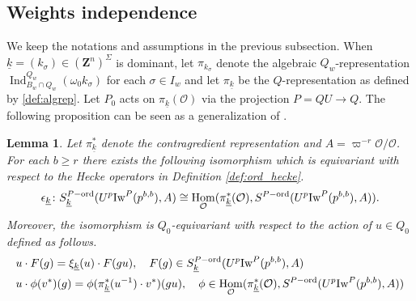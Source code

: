 \documentclass[leqno]{amsart}
\newtheorem{lem}[thm]{Lemma}
\theoremstyle{definition}
\theoremstyle{remark}
\newcommand{\oo}{\mathcal{O}}
\newcommand{\Z}{{\mathbf{Z}}}
\DeclareMathOperator{\Hom}{Hom}
\DeclareMathOperator{\Ind}{Ind}
\newcommand{\wt}[1]{\underline{ #1 }}
\newcommand{\Iw}{\textnormal{Iw}} %
\newcommand{\ord}{\textnormal{ord}} %
\begin{document}
\subsection{Weights independence}

We keep the notations and assumptions in the 
previous subsection.
When $\wt{k}=(k_\sigma)\in (\Z^n)^{\Sigma}$ is dominant,
let $\pi_{k_{\sigma}}$ denote 
the algebraic $Q_w$-representation
$\Ind_{B_w\cap Q_w}^{Q_w}(\omega_0 k_\sigma)$
for each $\sigma\in I_w$ 
and let $\pi_{\wt{k}}$ be the $Q$-representation
as defined by \eqref{def:algrep}.
Let $P_0$ acts on $\pi_{\wt{k}}(\oo)$
via the projection $P=QU\to Q$.
The following proposition can be seen as
a generalization of \cite[Prop 2.22]{ger}.

\begin{lem}
	Let $\pi_{\wt{k}}^*$ denote the contragredient
	representation and $A=\varpi^{-r}\oo/\oo$.
	For each $b\geq r$ there exists 
    the following isomorphism 
    which is equivariant with respect to the Hecke operators
    in Definition \ref{def:ord_hecke}.
	\[
		\epsilon_{\wt{k}} \colon 
		S_{\wt{k}}^{P-\ord}(U^p\Iw^P(p^{b,b}),A)\cong 
		\Hom_{\oo}(\pi_{\wt{k}}^*(\oo),
		S^{P-\ord}(U^p\Iw^P(p^{b,b}),A)).
	\]
	Moreover, the isomorphism is $Q_0$-equivariant 
    with respect to
	the action of $u\in Q_0$ defined as follows.
	\begin{align*}
	&u\cdot F(g)=\xi_{\wt{k}}(u)\cdot F(gu),\quad
	F(g)\in S_{\wt{k}}^{P-\ord}(U^p\Iw^P(p^{b,b}),A)\\
	&u\cdot \phi(v^*)(g)=
	\phi(\pi^*_{\wt{k}}(u^{-1})\cdot v^*)(gu),\quad
	\phi\in \Hom_{\oo}(\pi_{\wt{k}}^*(\oo),
	S^{P-\ord}(U^p\Iw^P(p^{b,b}),A))
	\end{align*}
\end{lem}
\end{document}
